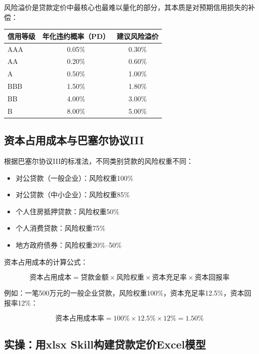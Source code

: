 风险溢价是贷款定价中最核心也最难以量化的部分，其本质是对预期信用损失的补偿：

\begin{table}[H]
\centering
\begin{tabular}{lcc}
\toprule
\textbf{信用等级} & \textbf{年化违约概率（PD）} & \textbf{建议风险溢价} \\
\midrule
AAA & 0.05\% & 0.30\% \\
AA & 0.20\% & 0.60\% \\
A & 0.50\% & 1.00\% \\
BBB & 1.50\% & 1.80\% \\
BB & 4.00\% & 3.00\% \\
B & 8.00\% & 5.00\% \\
\bottomrule
\end{tabular}
\end{table}

\subsection{资本占用成本与巴塞尔协议III}

根据巴塞尔协议III的标准法，不同类别贷款的风险权重不同：

\begin{itemize}[leftmargin=2em]
  \item 对公贷款（一般企业）：风险权重100\%
  \item 对公贷款（中小企业）：风险权重85\%
  \item 个人住房抵押贷款：风险权重50\%
  \item 个人消费贷款：风险权重75\%
  \item 地方政府债券：风险权重20\%--50\%
\end{itemize}

资本占用成本的计算公式：

\[
\text{资本占用成本} = \text{贷款金额} \times \text{风险权重} \times \text{资本充足率} \times \text{资本回报率}
\]

例如：一笔500万元的一般企业贷款，风险权重100\%，资本充足率12.5\%，资本回报率12\%：

\[
\text{资本占用成本率} = 100\% \times 12.5\% \times 12\% = 1.50\%
\]

\subsection{实操：用xlsx Skill构建贷款定价Excel模型}

